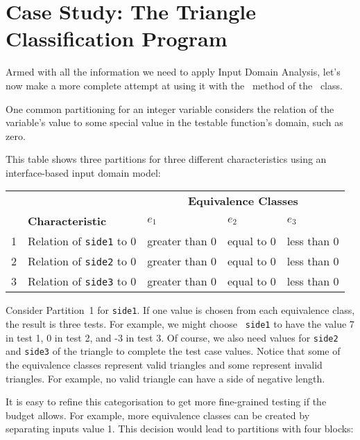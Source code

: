 \section{Case Study: The Triangle Classification Program}

Armed with all the information we need to apply Input Domain Analysis, let's now
make a more complete attempt at using it with the \classifymethod~method of the
\triangleclass~class. 

One common partitioning for an integer variable considers the relation of the
variable's value to some special value in the testable function's domain, such
as zero.

This table shows three partitions for three different characteristics using an
interface-based input domain model:

\begin{center}
\begin{tabular}{rllll}
    \toprule
    & & \multicolumn{3}{c}{\bf Equivalence Classes} \\
    \cline{3-5}
    & {\bf Characteristic} & $e_1$ & $e_2$ & $e_3$ \\
    \midrule
    1 & Relation of {\tt side1} to 0 & greater than 0 & equal to 0 & less than 0 \\
    2 & Relation of {\tt side2} to 0 & greater than 0 & equal to 0 & less than 0 \\
    3 & Relation of {\tt side3} to 0 & greater than 0 & equal to 0 & less than 0 \\
    \bottomrule    
\end{tabular}
\end{center}

Consider Partition~1 for {\tt side1}. If one value is chosen from each
equivalence class, the result is three tests. For example, we might choose {\tt
side1} to have the value 7 in test 1, 0 in test 2, and -3 in test 3. Of course,
we also need values for {\tt side2} and {\tt side3} of the triangle to complete
the test case values. Notice that some of the equivalence classes represent
valid triangles and some represent invalid triangles. For example, no valid
triangle can have a side of negative length. 

It is easy to refine this categorisation to get more fine-grained testing if the
budget allows. For example, more equivalence classes can be created by
separating inputs value 1. This decision would lead to partitions with four
blocks:

